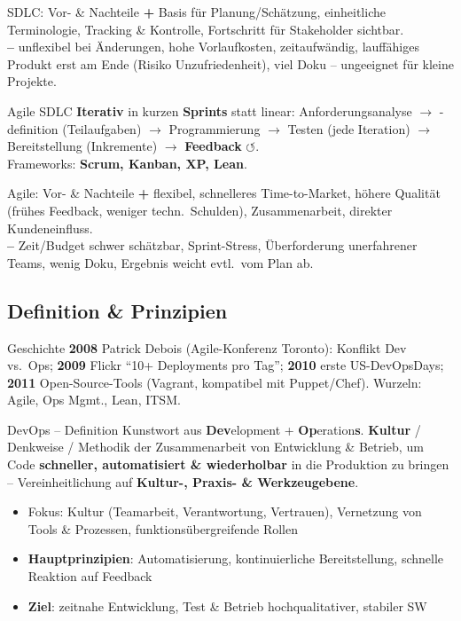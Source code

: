 \documentclass[a4paper, fontsize=7pt]{scrartcl}
\begin{document}
\begin{subbox}{SDLC: Vor- \& Nachteile}
\textbf{+} Basis für Planung/Schätzung, einheitliche Terminologie,
Tracking \& Kontrolle, Fortschritt für Stakeholder sichtbar.\\
\textbf{--} unflexibel bei Änderungen, hohe Vorlaufkosten, zeitaufwändig,
lauffähiges Produkt erst am Ende (Risiko Unzufriedenheit), viel Doku --
ungeeignet für kleine Projekte.
\end{subbox}

\begin{mainbox}{Agile SDLC}
\textbf{Iterativ} in kurzen \textbf{Sprints} statt linear:
Anforderungsanalyse $\to$ -definition (Teilaufgaben) $\to$ Programmierung
$\to$ Testen (jede Iteration) $\to$ Bereitstellung (Inkremente) $\to$
\textbf{Feedback} $\circlearrowleft$.\\
Frameworks: \textbf{Scrum, Kanban, XP, Lean}.
\end{mainbox}

\begin{subbox}{Agile: Vor- \& Nachteile}
\textbf{+} flexibel, schnelleres Time-to-Market, höhere Qualität (frühes
Feedback, weniger techn.\ Schulden), Zusammenarbeit, direkter
Kundeneinfluss.\\
\textbf{--} Zeit/Budget schwer schätzbar, Sprint-Stress, Überforderung
unerfahrener Teams, wenig Doku, Ergebnis weicht evtl.\ vom Plan ab.
\end{subbox}

\subsection{Definition \& Prinzipien}

\begin{subbox}{Geschichte}
\textbf{2008} Patrick Debois (Agile-Konferenz Toronto): Konflikt Dev vs.\
Ops; \textbf{2009} Flickr ``10+ Deployments pro Tag''; \textbf{2010} erste
US-DevOpsDays; \textbf{2011} Open-Source-Tools (Vagrant, kompatibel mit
Puppet/Chef). Wurzeln: Agile, Ops Mgmt., Lean, ITSM.
\end{subbox}

\begin{mainbox}{DevOps -- Definition}
Kunstwort aus \textbf{Dev}elopment + \textbf{Op}eration\textbf{s}.
\textbf{Kultur} / Denkweise / Methodik der Zusammenarbeit von Entwicklung \&
Betrieb, um Code \textbf{schneller, automatisiert \& wiederholbar} in die
Produktion zu bringen -- Vereinheitlichung auf \textbf{Kultur-, Praxis- \&
Werkzeugebene}.
\begin{itemize}
    \item Fokus: Kultur (Teamarbeit, Verantwortung, Vertrauen), Vernetzung
          von Tools \& Prozessen, funktionsübergreifende Rollen
    \item \textbf{Hauptprinzipien}: Automatisierung, kontinuierliche
          Bereitstellung, schnelle Reaktion auf Feedback
    \item \textbf{Ziel}: zeitnahe Entwicklung, Test \& Betrieb
          hochqualitativer, stabiler SW
\end{itemize}
\end{mainbox}
\end{document}

